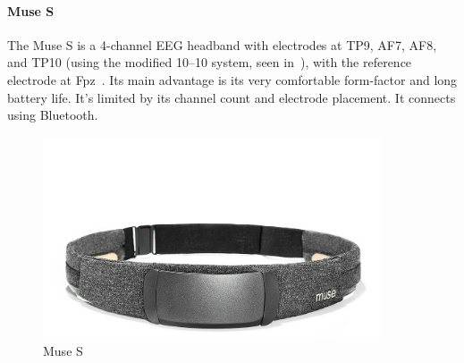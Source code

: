     \begin{minipage}{\textwidth}
        \paragraph*{Muse S}
        The Muse S is a 4-channel EEG headband with electrodes at TP9, AF7, AF8, and TP10 (using the modified 10--10 system, seen in~), with the reference electrode at Fpz~\cite{krigolson_choosing_2017}. Its main advantage is its very comfortable form-factor and long battery life. It's limited by its channel count and electrode placement. It connects using Bluetooth.

        \begin{figure}[H]
            \centering
            \includegraphics[trim=0 0 0 200,clip,width=100mm]{img/Muse-S.jpg}
            \caption{Muse S}\label{fig:museS}
        \end{figure}
    \end{minipage}

